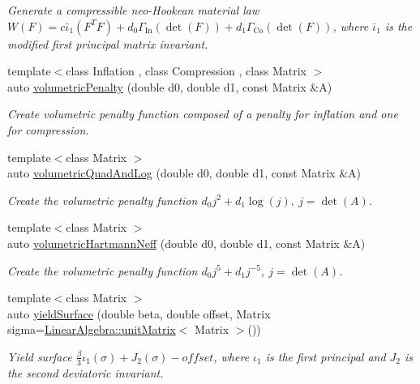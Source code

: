 \begin{DoxyCompactItemize}
\begin{DoxyCompactList}\small\item\em Generate a compressible neo-\/\+Hookean material law $ W(F)=c\bar\iota_1(F^T F)+d_0\Gamma_\mathrm{In}(\det(F))+d_1\Gamma_\mathrm{Co}(\det(F)) $, where $\bar\iota_1$ is the modified first principal matrix invariant. \end{DoxyCompactList}\item 
{\footnotesize template$<$class Inflation , class Compression , class Matrix $>$ }\\auto \hyperlink{namespaceFunG_ad26faeb264bb4b1cd7e70f3811c366c8}{volumetric\+Penalty} (double d0, double d1, const Matrix \&A)
\begin{DoxyCompactList}\small\item\em Create volumetric penalty function composed of a penalty for inflation and one for compression. \end{DoxyCompactList}\item 
{\footnotesize template$<$class Matrix $>$ }\\auto \hyperlink{namespaceFunG_aaf30b9c36ed86e01b94f6b7c1d95cae8}{volumetric\+Quad\+And\+Log} (double d0, double d1, const Matrix \&A)
\begin{DoxyCompactList}\small\item\em Create the volumetric penalty function $ d_0 j^2 + d_1 \log(j),\ j=\det(A) $. \end{DoxyCompactList}\item 
{\footnotesize template$<$class Matrix $>$ }\\auto \hyperlink{namespaceFunG_adf4be5df85ea9df10cc9e11c11aaeb7b}{volumetric\+Hartmann\+Neff} (double d0, double d1, const Matrix \&A)
\begin{DoxyCompactList}\small\item\em Create the volumetric penalty function $ d_0 j^5 + d_1 j^{-5},\ j=\det(A) $. \end{DoxyCompactList}\item 
{\footnotesize template$<$class Matrix $>$ }\\auto \hyperlink{namespaceFunG_a4784211358c877f05ad9426850303273}{yield\+Surface} (double beta, double offset, Matrix sigma=\hyperlink{group__LinearAlgebraGroup_ga88a596b8526c0ed98ce241244fb85948}{Linear\+Algebra\+::unit\+Matrix}$<$ Matrix $>$())
\begin{DoxyCompactList}\small\item\em Yield surface $ \frac{\beta}{3}\iota_1(\sigma) + J_2(\sigma)-offset $, where $\iota_1$ is the first principal and $J_2$ is the second deviatoric invariant. \end{DoxyCompactList}\item 

\end{DoxyCompactItemize}
